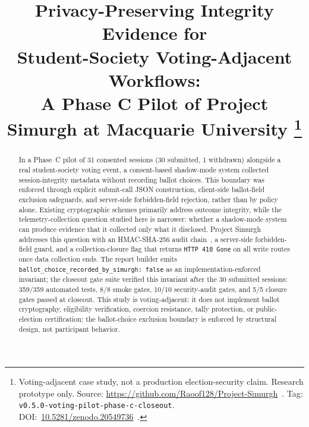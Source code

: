 \documentclass[conference]{IEEEtran}
\newcommand{\sys}{Project Simurgh}
\begin{document}
\title{Privacy-Preserving Integrity Evidence for\\Student-Society Voting-Adjacent Workflows:\\
A Phase C Pilot of \sys{} at Macquarie University%
\thanks{Voting-adjacent case study, not a production election-security claim.
Research prototype only. Source:
\url{https://github.com/Raoof128/Project-Simurgh}~\cite{simurgh2026}.
Tag: \texttt{v0.5.0-voting-pilot-phase-c-closeout}.
DOI:~\href{https://doi.org/10.5281/zenodo.20549736}{10.5281/zenodo.20549736}~\cite{abedini2026votingpilot}.}}

\author{
}

\maketitle

\begin{abstract}
In a Phase~C pilot of 31 consented sessions (30 submitted, 1 withdrawn)
alongside a real student-society voting event, a consent-based shadow-mode
system collected session-integrity metadata without recording ballot choices.
This boundary was enforced through explicit submit-call JSON construction,
client-side ballot-field exclusion safeguards, and server-side
forbidden-field rejection, rather than by policy alone.
Existing cryptographic schemes primarily address outcome integrity, while the
telemetry-collection question studied here is narrower: whether a shadow-mode
system can produce evidence that it collected only what it disclosed.
\sys{} addresses this question with an HMAC-SHA-256 audit chain~\cite{rfc2104},
a server-side forbidden-field guard, and a collection-closure flag that returns
\texttt{HTTP~410 Gone} on all write routes once data collection ends.
The report builder emits
\texttt{ballot\_choice\_recorded\_by\_simurgh: false}
as an implementation-enforced invariant; the closeout gate suite verified this
invariant after the 30 submitted sessions: 359/359 automated tests, 8/8 smoke
gates, 10/10 security-audit gates, and 5/5 closure gates passed at closeout.
This study is voting-adjacent: it does not implement ballot cryptography,
eligibility verification, coercion resistance, tally protection, or
public-election certification; the ballot-choice exclusion boundary is
enforced by structural design, not participant behavior.
\end{abstract}
\end{document}
